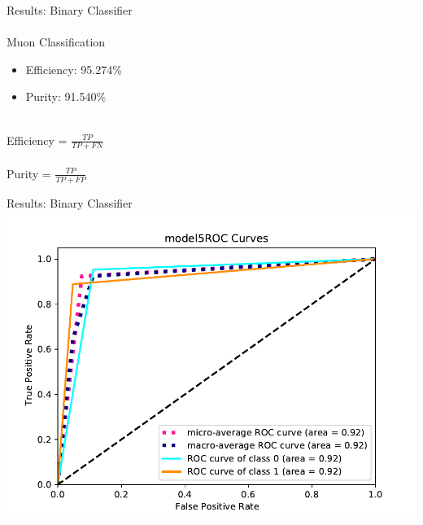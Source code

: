 \documentclass[10pt,handout]{beamer}
\begin{document}
\begin{frame}{Results: Binary Classifier}
\centering
\quad \\ \quad \\
Muon Classification \\
\begin{itemize}
\centering
\item Efficiency: 95.274\%
\item Purity: 91.540\%
\end{itemize}
\quad \quad \\
Efficiency = $\frac{TP}{TP+FN}$ \\
\quad \\
Purity = $\frac{TP}{TP+FP}$
\end{frame}

\begin{frame}{Results: Binary Classifier}
\centering
\includegraphics[scale=0.6]{model5_ROCcurves.pdf}
\end{frame}
\end{document}
